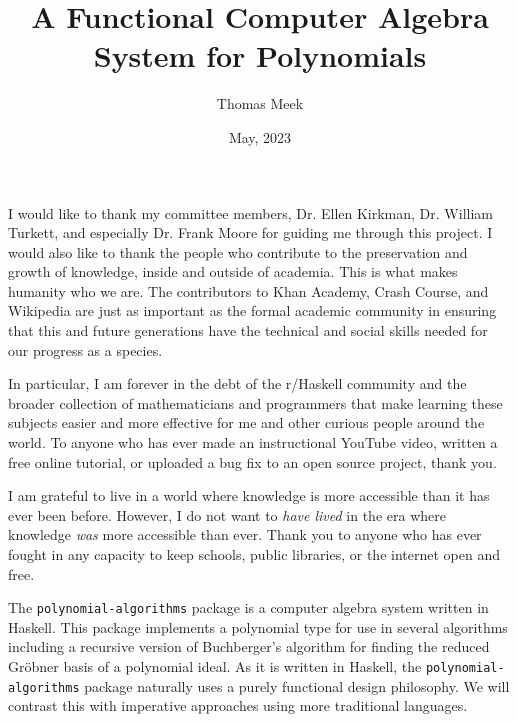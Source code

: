\documentclass[MS, xcolor=dvipsnames]{wfuthesis}
\theoremstyle{definition}
\begin{document}
\title{A Functional Computer Algebra System for Polynomials}
\author{Thomas Meek}


\date{May, 2023}

\maketitle

\clearpage


\acknowledgments

I would like to thank my committee members, Dr. Ellen Kirkman, Dr. William Turkett, and especially Dr. Frank Moore for guiding me through this project. I would also like to thank the people who contribute to the preservation and growth of knowledge, inside and outside of academia. This is what makes humanity who we are. The contributors to Khan Academy, Crash Course, and Wikipedia are just as important as the formal academic community in ensuring that this and future generations have the technical and social skills needed for our progress as a species. \par
In particular, I am forever in the debt of the r/Haskell community and the broader collection of mathematicians and programmers that make learning these subjects easier and more effective for me and other curious people around the world. To anyone who has ever made an instructional YouTube video, written a free online tutorial, or uploaded a bug fix to an open source project, thank you. \par
I am grateful to live in a world where knowledge is more accessible than it has ever been before. However, I do not want to \emph{have lived} in the era where knowledge \emph{was} more accessible than ever. Thank you to anyone who has ever fought in any capacity to keep schools, public libraries, or the internet open and free.

\tableofcontents

\abstract


The \lstinline{polynomial-algorithms} package is a computer algebra system written in Haskell. This package implements a polynomial type for use in several algorithms including a recursive version of Buchberger's algorithm for finding the reduced Gr\"obner basis of a polynomial ideal. As it is written in Haskell, the \lstinline{polynomial-algorithms} package naturally uses a purely functional design philosophy. We will contrast this with imperative approaches using more traditional languages. %
\end{document}
